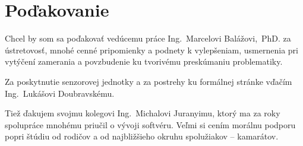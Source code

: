 \thispagestyle{empty}
\vspace*{\fill}
\section*{Poďakovanie}
Chcel by som sa poďakovať vedúcemu práce Ing.~Marcelovi Balážovi,~PhD. za ústretovosť, mnohé cenné pripomienky a podnety k vylepšeniam, usmernenia pri vytýčení zamerania a povzbudenie ku tvorivému preskúmaniu problematiky. 

Za poskytnutie  senzorovej jednotky a za postrehy ku formálnej stránke vďačím Ing.~Lukášovi Doubravskému. 

Tiež ďakujem svojmu kolegovi Ing.~Michalovi Juranyimu, ktorý ma za roky spolupráce mnohému priučil o vývoji softvéru.
Veľmi si cením morálnu podporu popri štúdiu od rodičov a od najbližšieho okruhu spolužiakov -- kamarátov.
\vspace{3cm}